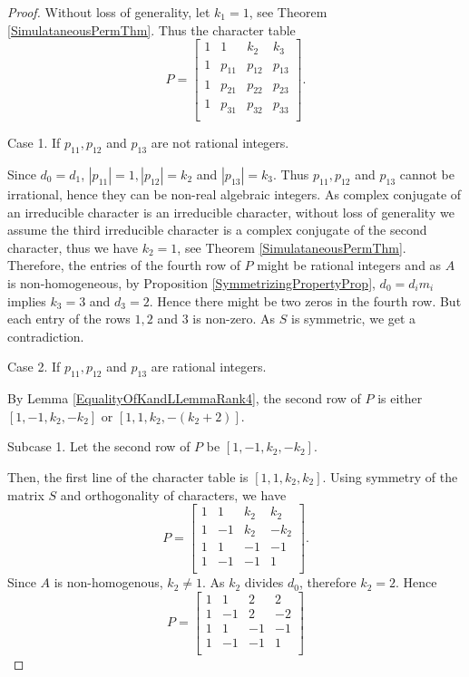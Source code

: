 \documentclass[12pt]{amsart}
\begin{document}
\begin{proof} Without loss of generality, let $k_1=1$, see Theorem \ref{SimulataneousPermThm}. Thus the character table
$$P=\left[
   \begin{array}{cccc}
     1 & 1 & k_2 & k_3\\
     1 & p_{11} &   p_{12} & p_{13}\\
       1 & p_{21} &  p_{22}&  p_{23}\\
         1 & p_{31} &  p_{32}&  p_{33}\\
   \end{array}
 \right].$$

Case 1. If $p_{11},  p_{12}$ and  $p_{13}$ are not rational integers.

\smallskip

Since $d_0=d_1$, $|p_{11}|=1, |p_{12}|=k_2$ and $|p_{13}|=k_3$. Thus $p_{11},  p_{12}$ and  $p_{13}$ cannot be irrational, hence they can be non-real algebraic integers. As complex conjugate of an irreducible character is an irreducible character, without loss of generality we assume the third irreducible character is a complex conjugate of the second character, thus we have $k_2=1$, see Theorem \ref{SimulataneousPermThm}. Therefore, the entries of the fourth row of $P$ might be rational integers and as $A$ is non-homogeneous, by Proposition \ref{SymmetrizingPropertyProp}, $d_0=d_im_i$  implies $k_3=3$ and $d_3=2$. Hence there might be two zeros in the fourth row. But each entry of the rows $1, 2$ and $3$ is non-zero. As $S$ is symmetric, we get a contradiction.

\medskip

Case 2. If $p_{11},  p_{12}$ and  $p_{13}$ are rational integers.

\smallskip

By Lemma \ref{EqualityOfKandLLemmaRank4}, the second row of $P$ is either $[1,-1,k_2,-k_2]$ or $[1,1,k_2,-(k_2+2)]$.

\medskip

Subcase 1. Let the second row of $P$ be $[1,-1,k_2,-k_2]$.

\smallskip

Then, the first line of the character table is $[1,1,k_2,k_2]$.
Using symmetry of the matrix $S$ and orthogonality of characters, we have
$$P=\left[
   \begin{array}{cccc}
     1 & 1 & k_2 &k_2\\
     1 & -1 &    k_2 &  -k_2\\
      1 &  1 &  -1&  -1\\
         1 & -1 &  -1&  1\\
   \end{array}
 \right].$$
Since $A$ is non-homogenous, $k_2\neq1$. As $k_2$ divides $d_0$, therefore $k_2=2$. Hence
$$P=\left[
   \begin{array}{cccc}
     1 & 1 & 2 &2\\
     1 & -1 &    2 &  -2\\
       1 &  1 &  -1&  -1\\
         1 & -1 &  -1&  1\\
   \end{array}\right]$$


\end{proof}
\end{document}
